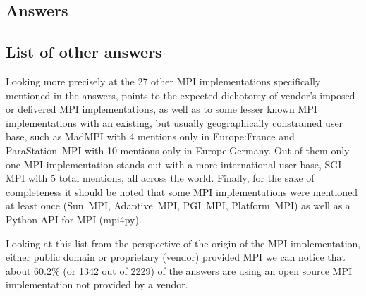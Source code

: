
\subsection{Answers}



\subsection{List of other answers}

Looking more precisely at the 27 other MPI implementations specifically
mentioned in the answers, points to the expected dichotomy of vendor's imposed
or delivered MPI implementations, as well as to some lesser known MPI
implementations with an existing, but usually geographically constrained user
base, such as MadMPI with 4 mentions only in Europe:France and ParaStation~MPI
with 10 mentions only in Europe:Germany. Out of them only one MPI implementation
stands out with a more international user base, SGI MPI with 5 total mentions,
all across the world. Finally, for the sake of completeness it should be noted
that some MPI implementations were mentioned at least once (Sun~MPI,
Adaptive~MPI, PGI~MPI, Platform~MPI) as well as a Python API for MPI (mpi4py).



Looking at this list from the perspective of the origin of the MPI
implementation, either public domain or proprietary (vendor) provided MPI we can
notice that about 60.2\% (or 1342 out of 2229) of the answers are using an open
source MPI implementation not provided by a vendor.

\begin{report}
\begin{itemize}

\end{itemize}
\end{report}

